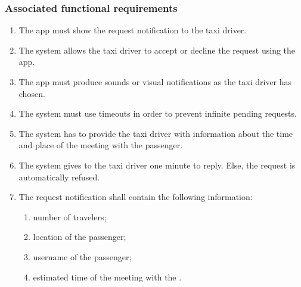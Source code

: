\subsubsection{Associated functional requirements}
\begin{enumerate}
\item The app must show the request notification to the taxi driver.
\item The system allows the taxi driver to accept or decline the request using the app.
\item The app must produce sounds or visual notifications as the taxi driver has chosen.
\item The system must use timeouts in order to prevent infinite pending requests.
\item The system has to provide the taxi driver with information about the time and place of the meeting with the passenger.
\item The system gives to the taxi driver one minute to reply. Else, the request is automatically refused.
\item The request notification shall contain the following information:
\begin{enumerate}
	\item number of travelers;
	\item location of the passenger;
	\item username of the passenger;
	\item estimated time of the meeting with the .
\end{enumerate}
\end{enumerate}
